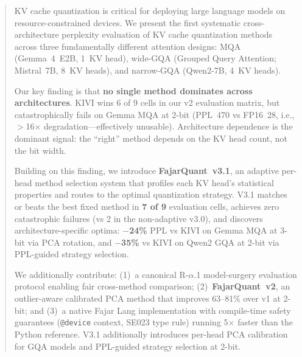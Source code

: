 \documentclass{article}
\begin{document}

\begin{abstract}
KV cache quantization is critical for deploying large language models on
resource-constrained devices. We present the first systematic
cross-architecture perplexity evaluation of KV cache quantization
methods across three fundamentally different attention designs: MQA
(Gemma~4~E2B, 1~KV head), wide-GQA (Grouped Query Attention;
Mistral~7B, 8~KV heads), and narrow-GQA (Qwen2-7B, 4~KV heads).

Our key finding is that \textbf{no single method dominates across
architectures}. KIVI wins 6 of 9 cells in our v2 evaluation matrix, but
catastrophically fails on Gemma MQA at 2-bit (PPL~470 vs FP16~28,
i.e., $>$16$\times$ degradation---effectively unusable).
Architecture dependence is the dominant signal: the ``right'' method
depends on the KV head count, not the bit width.

Building on this finding, we introduce \textbf{FajarQuant~v3.1}, an
adaptive per-head method selection system that profiles each KV head's
statistical properties and routes to the optimal quantization strategy.
V3.1 matches or beats the best fixed method in \textbf{7 of 9} evaluation
cells, achieves zero catastrophic failures (vs 2 in the non-adaptive
v3.0), and discovers architecture-specific optima: \textbf{$-$24\%}
PPL vs KIVI on Gemma MQA at 3-bit via PCA rotation, and
\textbf{$-$35\%} vs KIVI on Qwen2 GQA at 2-bit via PPL-guided strategy
selection.

We additionally contribute: (1)~a canonical R-$\alpha$.1 model-surgery
evaluation protocol enabling fair cross-method comparison;
(2)~\textbf{FajarQuant~v2}, an outlier-aware calibrated PCA method that
improves 63--81\% over v1 at 2-bit; and (3)~a native Fajar Lang
implementation with compile-time safety guarantees (\texttt{@device}
context, SE023 type rule) running 5$\times$ faster than the Python
reference. V3.1 additionally introduces per-head PCA calibration for
GQA models and PPL-guided strategy selection at 2-bit.
\end{abstract}
\end{document}
